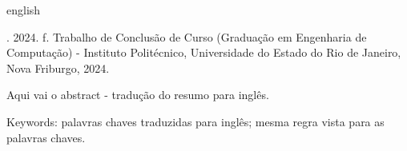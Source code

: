 
\begin{resumo}[Abstract]
\begin{otherlanguage*}{english}
\begin{SingleSpace}

\noindent
\begin{flushleft}
\entradaAutor{}. \textit{\englishTitle{}} 2024.\pageref{LastPage} f. Trabalho de Conclusão de Curso (Graduação em Engenharia de Computação) - Instituto Politécnico, Universidade do Estado do Rio de Janeiro, Nova Friburgo, 2024.
\end{flushleft}
\vspace{\onelineskip}

\setlength{\parindent}{1.3cm}

Aqui vai o abstract - tradução do resumo para inglês. 

\vspace{\onelineskip}
\noindent Keywords: palavras chaves traduzidas para inglês; mesma regra vista para as palavras chaves. 

\end{SingleSpace}
\end{otherlanguage*}
\end{resumo}